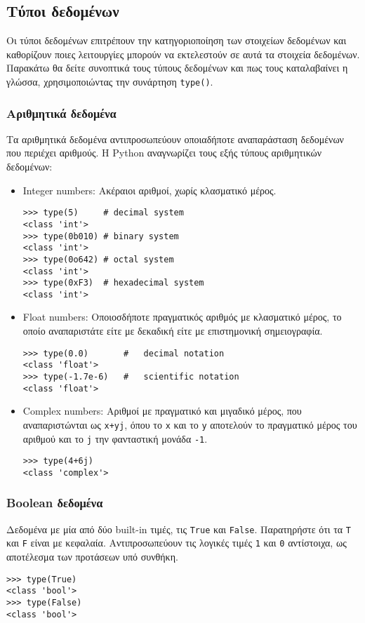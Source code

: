 \documentclass[14pt]{extreport}
\begin{document}
\subsection{Τύποι δεδομένων}

Οι τύποι δεδομένων επιτρέπουν την κατηγοριοποίηση των στοιχείων δεδομένων και καθορίζουν ποιες λειτουργίες μπορούν να εκτελεστούν σε αυτά τα στοιχεία δεδομένων. Παρακάτω θα δείτε συνοπτικά τους τύπους δεδομένων και πως τους καταλαβαίνει η γλώσσα, χρησιμοποιώντας την συνάρτηση \lstinline{type()}.

\subsubsection{Αριθμητικά δεδομένα}

Τα αριθμητικά δεδομένα αντιπροσωπεύουν οποιαδήποτε αναπαράσταση δεδομένων που περιέχει αριθμούς. Η Python αναγνωρίζει τους εξής τύπους αριθμητικών δεδομένων:

\begin{itemize}
    \itemsep0cm
    \item Integer numbers: Ακέραιοι αριθμοί, χωρίς κλασματικό μέρος.
          \begin{lstlisting}[numbers=none]
>>> type(5)     # decimal system
<class 'int'>
>>> type(0b010) # binary system
<class 'int'>
>>> type(0o642) # octal system
<class 'int'>
>>> type(0xF3)  # hexadecimal system
<class 'int'>
\end{lstlisting}
    \item Float numbers: Οποιοσδήποτε πραγματικός αριθμός με κλασματικό μέρος, το οποίο αναπαριστάτε είτε με δεκαδική είτε με επιστημονική σημειογραφία.
          \begin{lstlisting}[numbers=none]
>>> type(0.0)       #   decimal notation
<class 'float'>
>>> type(-1.7e-6)   #   scientific notation
<class 'float'>
\end{lstlisting}
    \item Complex numbers: Αριθμοί με πραγματικό και μιγαδικό μέρος, που αναπαριστώνται ως \lstinline{x+yj}, όπου το \lstinline{x} και το \lstinline{y} αποτελούν το πραγματικό μέρος του αριθμού και το \lstinline{j} την φανταστική μονάδα \lstinline{-1}.
          \begin{lstlisting}[numbers=none]
>>> type(4+6j)
<class 'complex'>
\end{lstlisting}
\end{itemize}

\subsubsection{Boolean δεδομένα}
Δεδομένα με μία από δύο built-in τιμές, τις \lstinline{True} και \lstinline{False}. Παρατηρήστε ότι τα \lstinline{T} και \lstinline{F} είναι με κεφαλαία. Αντιπροσωπεύουν τις λογικές τιμές \lstinline{1} και \lstinline{0} αντίστοιχα, ως αποτέλεσμα των προτάσεων υπό συνθήκη.
\begin{lstlisting}[numbers=none]
>>> type(True)
<class 'bool'>
>>> type(False)
<class 'bool'>        
\end{lstlisting}
\end{document}
